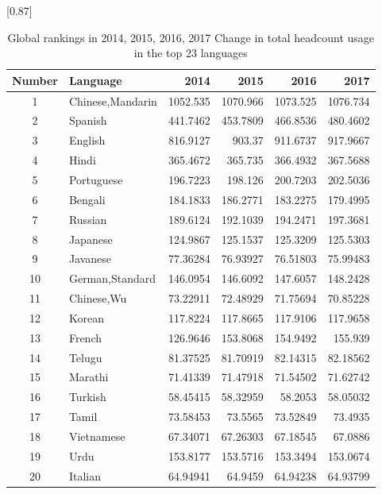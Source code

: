 \begin{table}[H]
	\centering
	\caption{Global rankings in 2014, 2015, 2016, 2017 Change in total headcount usage in the top 23 languages}
		 \scalebox{0.87}[0.87]{%
	\begin{tabular*}{35em}{@{\extracolsep{\fill}}clrrrr}
		\toprule
		\multicolumn{1}{l}{Number} & Language & 2014  & 2015  & 2016  & 2017 \\
		\midrule
		1     & Chinese,Mandarin & 1052.535 & 1070.966 & 1073.525 & 1076.734 \\
		2     & Spanish & 441.7462 & 453.7809 & 466.8536 & 480.4602 \\
		3     & English & 816.9127 & 903.37 & 911.6737 & 917.9667 \\
		4     & Hindi & 365.4672 & 365.735 & 366.4932 & 367.5688 \\
		5     & Portuguese & 196.7223 & 198.126 & 200.7203 & 202.5036 \\
		6     & Bengali & 184.1833 & 186.2771 & 183.2275 & 179.4995 \\
		7     & Russian & 189.6124 & 192.1039 & 194.2471 & 197.3681 \\
		8     & Japanese & 124.9867 & 125.1537 & 125.3209 & 125.5303 \\
		9     & Javanese & 77.36284 & 76.93927 & 76.51803 & 75.99483 \\
		10    & German,Standard & 146.0954 & 146.6092 & 147.6057 & 148.2428 \\
		11    & Chinese,Wu & 73.22911 & 72.48929 & 71.75694 & 70.85228 \\
		12    & Korean & 117.8224 & 117.8665 & 117.9106 & 117.9658 \\
		13    & French & 126.9646 & 153.8068 & 154.9492 & 155.939 \\
		14    & Telugu & 81.37525 & 81.70919 & 82.14315 & 82.18562 \\
		15    & Marathi & 71.41339 & 71.47918 & 71.54502 & 71.62742 \\
		16    & Turkish & 58.45415 & 58.32959 & 58.2053 & 58.05032 \\
		17    & Tamil & 73.58453 & 73.5565 & 73.52849 & 73.4935 \\
		18    & Vietnamese & 67.34071 & 67.26303 & 67.18545 & 67.0886 \\
		19    & Urdu  & 153.8177 & 153.5716 & 153.3494 & 153.0674 \\
		20    & Italian & 64.94941 & 64.9459 & 64.94238 & 64.93799 \\
		\bottomrule
	\end{tabular*}%
}
	\label{tab:addlabel}%
\end{table}%

